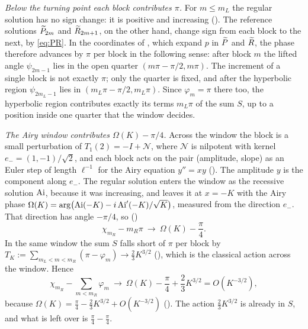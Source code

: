 \emph{Below the turning point each block contributes $\pi$.} For $m\le m_L$ the regular
solution has no sign change: it is positive and increasing (). The
reference solutions $\widetilde P_{2m}$ and $\widetilde R_{2m+1}$, on the other hand, change sign from each
block to the next, by \eqref{eq:PR}. In the coordinates of , which expand
$p$ in $\widetilde P$ and $\widetilde R$, the phase therefore advances by $\pi$ per block in the following sense: after
block $m$ the lifted angle $\psi_{2m-1}$ lies in the open quarter $(m\pi-\pi/2,m\pi)$. The increment of a
single block is not exactly $\pi$; only the quarter is fixed, and after the hyperbolic region
$\psi_{2m_L-1}$ lies in $(m_L\pi-\pi/2,m_L\pi)$. Since
$\varphi_m=\pi$ there too, the hyperbolic region contributes exactly its terms $m_L\pi$ of
the sum $S$, up to a position inside one quarter that the window decides.

\emph{The Airy window contributes $\Omega(K)-\pi/4$.} Across the window the block is a small
perturbation of $T_1(2)=-I+\mathcal N$, where $\mathcal N$ is nilpotent with kernel
$e_-=(1,-1)/\sqrt2$, and each block acts on the pair (amplitude, slope) as an Euler step
of length $\ell^{-1}$ for the Airy equation $y''=xy$ (). The amplitude
$y$ is the component along $e_-$. The regular
solution enters the window as the recessive solution $\operatorname{Ai}$, because it was increasing,
and leaves it at $x=-K$ with the Airy phase
$\Omega(K)=\arg\bigl(\operatorname{Ai}(-K)-i\operatorname{Ai}'(-K)/\sqrt K\bigr)$, measured from the direction $e_-$.
That direction has angle $-\pi/4$, so ()
\[
  \chi_{m_R}-m_R\pi\ \longrightarrow\ \Omega(K)-\frac\pi4 .
\]
In the same window the sum $S$ falls short of $\pi$ per block by
$T_K:=\sum_{m_L<m<m_R}(\pi-\varphi_m)\to\frac23K^{3/2}$ (), which is the
classical action across the window. Hence
\begin{equation}\label{eq:budget-window}
  \chi_{m_R}-\sum_{m<m_R}\varphi_m\ \longrightarrow\ \Omega(K)-\frac\pi4+\frac23K^{3/2}
  =O(K^{-3/2}),
\end{equation}
because $\Omega(K)=\frac\pi4-\frac23K^{3/2}+O(K^{-3/2})$ (). The action
$\frac23K^{3/2}$ is already in $S$, and what is left over is $\frac\pi4-\frac\pi4$.

